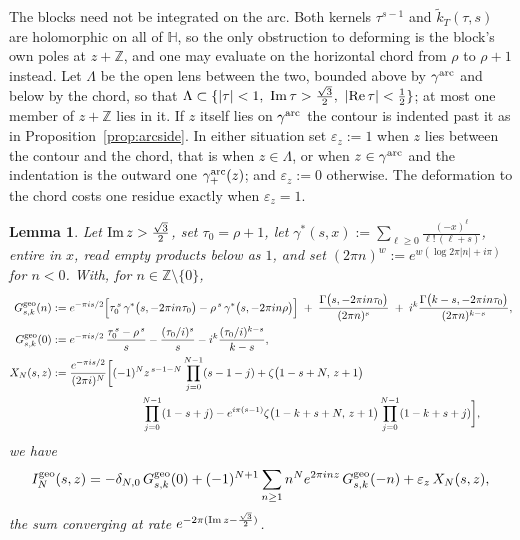 \documentclass[11pt]{article}
\newtheorem{lemma}[theorem]{Lemma}
\newcommand{\HH}{\mathbb{H}}
\newcommand{\ZZ}{\mathbb{Z}}
\newcommand{\tk}{\widetilde{k}_T}
\begin{document}
The blocks need not be integrated on the arc. Both kernels $\tau^{s-1}$ and $\tk(\tau,s)$ are
holomorphic on all of $\HH$, so the only obstruction to deforming is the block's own poles at
$z+\ZZ$, and one may evaluate on the horizontal chord from $\rho$ to $\rho+1$ instead. Let
$\Lambda$ be the open lens between the two, bounded above by $\gamma^{\rm arc}$ and below by the
chord, so that
$\Lambda\subset\{|\tau|<1,\ {\rm Im}\,\tau>\tfrac{\sqrt3}{2},\ |{\rm Re}\,\tau|<\tfrac12\}$; at
most one member of $z+\ZZ$ lies in it. If $z$ itself lies on $\gamma^{\rm arc}$ the contour is
indented past it as in Proposition~\ref{prop:arcside}. In either situation set $\varepsilon_z:=1$
when $z$ lies between the contour and the chord, that is when $z\in\Lambda$, or when
$z\in\gamma^{\rm arc}$ and the indentation is the outward one $\gamma^{\rm arc}_+(z)$; and
$\varepsilon_z:=0$ otherwise. The deformation to the chord costs one residue exactly when
$\varepsilon_z=1$.

\begin{lemma}\label{lem:geopolylog}
Let ${\rm Im}\,z>\tfrac{\sqrt3}{2}$, set $\tau_0=\rho+1$, let
$\gamma^*(s,x):=\sum_{\ell\ge0}\frac{(-x)^{\ell}}{\ell!\,(\ell+s)}$, entire in $x$, read empty
products below as $1$, and set $(2\pi n)^{w}:=e^{w(\log 2\pi|n|+i\pi)}$ for $n<0$. With, for
$n\in\ZZ\setminus\{0\}$,
\begin{align}\label{eq:geoG}
G^{\rm geo}_{s,k}(n)&:=e^{-\pi is/2}\Big[\tau_0^{\,s}\,\gamma^*\big(s,-2\pi in\tau_0\big)
-\rho^{\,s}\,\gamma^*\big(s,-2\pi in\rho\big)\Big]
\;+\;\frac{\Gamma\big(s,-2\pi in\tau_0\big)}{(2\pi n)^{s}}
\;+\;i^{k}\frac{\Gamma\big(k-s,-2\pi in\tau_0\big)}{(2\pi n)^{k-s}},\\
\label{eq:geoG0}
G^{\rm geo}_{s,k}(0)&:=e^{-\pi is/2}\,\frac{\tau_0^{\,s}-\rho^{\,s}}{s}
-\frac{(\tau_0/i)^{s}}{s}-i^{k}\frac{(\tau_0/i)^{k-s}}{k-s},
\\
\label{eq:geocross}
X_N(s,z)&:=\frac{e^{-\pi is/2}}{(2\pi i)^{N}}\bigg[(-1)^{N}z^{\,s-1-N}\prod_{j=0}^{N-1}(s-1-j)
+\zeta\big(1-s+N,\,z+1\big)
\\\nonumber&\qquad\qquad\qquad\qquad
\prod_{j=0}^{N-1}(1-s+j)
-e^{i\pi(s-1)}\zeta\big(1-k+s+N,\,z+1\big)\prod_{j=0}^{N-1}(1-k+s+j)\bigg],
\end{align}
we have
\begin{equation}\label{eq:geoIN}
I^{\rm geo}_N(s,z)=-\delta_{N,0}\,G^{\rm geo}_{s,k}(0)
+(-1)^{N+1}\sum_{n\ge1}n^{N}e^{2\pi inz}\,G^{\rm geo}_{s,k}(-n)
+\varepsilon_z\,X_N(s,z),
\end{equation}
the sum converging at rate $e^{-2\pi({\rm Im}\,z-\frac{\sqrt3}{2})}$.
\end{lemma}
\end{document}

